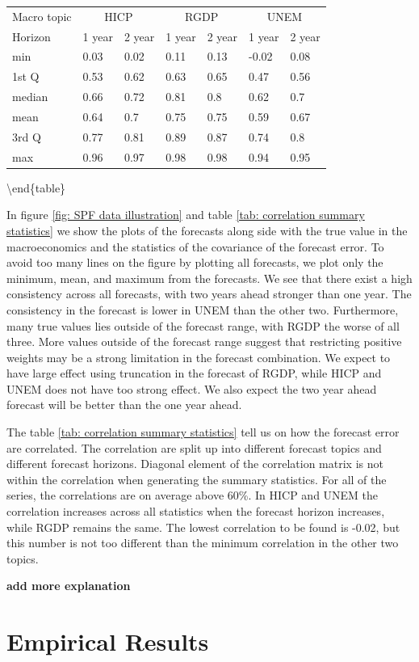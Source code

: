 \documentclass[]{article}
\begin{document}
\begin{tabular}{lllllll}
\hline
Macro topic & \multicolumn{2}{c}{HICP} & \multicolumn{2}{c}{RGDP} & \multicolumn{2}{c}{UNEM} \\
Horizon     & 1 year & 2 year & 1 year & 2 year & 1 year & 2 year \\ \hline
min         & 0.03        & 0.02        & 0.11        & 0.13        & -0.02        & 0.08       \\
1st Q       & 0.53        & 0.62        & 0.63        & 0.65        & 0.47         & 0.56       \\
median      & 0.66        & 0.72        & 0.81        & 0.8         & 0.62         & 0.7        \\
mean        & 0.64        & 0.7         & 0.75        & 0.75        & 0.59         & 0.67       \\
3rd Q       & 0.77        & 0.81        & 0.89        & 0.87        & 0.74         & 0.8        \\
max         & 0.96        & 0.97        & 0.98        & 0.98        & 0.94         & 0.95       \\ 
\hline
\end{tabular}

\textbackslash{}end\{table\}

In figure \ref{fig: SPF data illustration} and table
\ref{tab: correlation summary statistics} we show the plots of the
forecasts along side with the true value in the macroeconomics and the
statistics of the covariance of the forecast error. To avoid too many
lines on the figure by plotting all forecasts, we plot only the minimum,
mean, and maximum from the forecasts. We see that there exist a high
consistency across all forecasts, with two years ahead stronger than one
year. The consistency in the forecast is lower in UNEM than the other
two. Furthermore, many true values lies outside of the forecast range,
with RGDP the worse of all three. More values outside of the forecast
range suggest that restricting positive weights may be a strong
limitation in the forecast combination. We expect to have large effect
using truncation in the forecast of RGDP, while HICP and UNEM does not
have too strong effect. We also expect the two year ahead forecast will
be better than the one year ahead.

The table \ref{tab: correlation summary statistics} tell us on how the
forecast error are correlated. The correlation are split up into
different forecast topics and different forecast horizons. Diagonal
element of the correlation matrix is not within the correlation when
generating the summary statistics. For all of the series, the
correlations are on average above 60\%. In HICP and UNEM the correlation
increases across all statistics when the forecast horizon increases,
while RGDP remains the same. The lowest correlation to be found is
-0.02, but this number is not too different than the minimum correlation
in the other two topics.

\textbf{add more explanation}

\hypertarget{empirical-results}{%
\section{Empirical Results}\label{empirical-results}}
\end{document}
